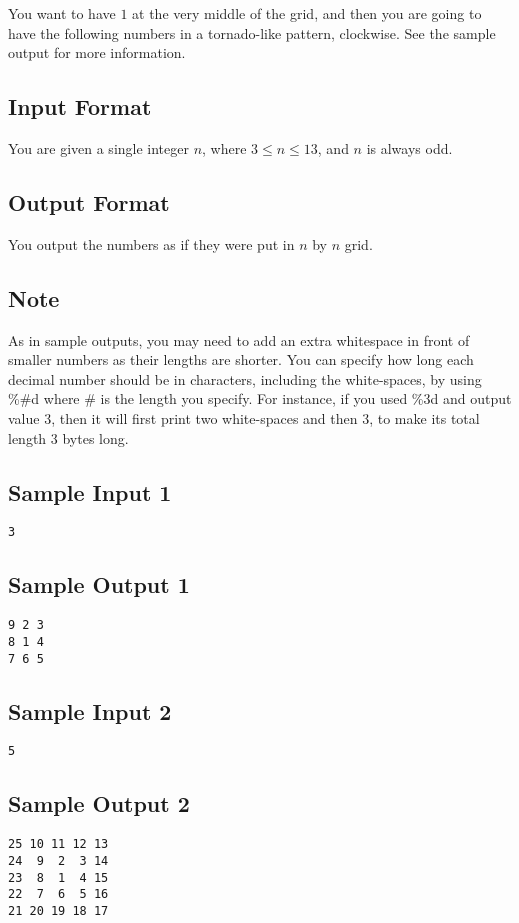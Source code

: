 You want to have $1$ at the very middle of the grid, and then you are going to have the following numbers in a tornado-like pattern, clockwise.  See the sample output for more information.

\subsection*{Input Format}
You are given a single integer $n$, where $3 \leq n \leq 13$, and $n$ is always odd. 
\subsection*{Output Format}
You output the numbers as if they were put in $n$ by $n$ grid.

\subsection*{Note}
As in sample outputs, you may need to add an extra whitespace in front of smaller numbers as their lengths are shorter. 
You can specify how long each decimal number should be in characters, including the white-spaces, by using \%\#d where \# is the length you specify.
For instance, if you used \%3d and output value 3, then it will first print two white-spaces and then 3, to make its total length 3 bytes long.


\subsection*{Sample Input 1}
\begin{verbatim}
3
\end{verbatim}

\subsection*{Sample Output 1}
\begin{verbatim}
9 2 3
8 1 4
7 6 5
\end{verbatim}

\subsection*{Sample Input 2}
\begin{verbatim}
5
\end{verbatim}

\subsection*{Sample Output 2}
\begin{verbatim}
25 10 11 12 13
24  9  2  3 14
23  8  1  4 15
22  7  6  5 16
21 20 19 18 17
\end{verbatim}


